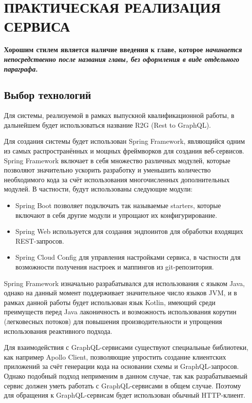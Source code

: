 \chapter{ПРАКТИЧЕСКАЯ РЕАЛИЗАЦИЯ СЕРВИСА}\label{ch:ch3}

\textbf{Хорошим стилем является наличие введения к главе, которое \textit{начинается непосредственно после названия главы, без оформления в виде отдельного параграфа}.}

\section{Выбор технологий}\label{sec:choose-technology}

Для системы, реализуемой в рамках выпускной квалификационной работы, в дальнейшем будет использоваться название R2G (Rest to GraphQL).

Для создания системы будет использован Spring Framework, являющийся одним из самых распространённых и мощных фреймворков для создания веб-сервисов.
Spring Framework включает в себя множество различных модулей, которые позволяют значительно ускорить разработку и уменьшить количество необходимого кода за счёт использования многочисленных дополнительных модулей.
В частности, будут использованы следующие модули:

\begin{itemize}
	\item Spring Boot позволяет подключать так называемые starters, которые включают в себя другие модули и упрощают их конфигурирование.
	\item Spring Web используется для создания эндпоинтов для обработки входящих REST-запросов.
	\item Spring Cloud Config для управления настройками сервиса, в частности для возможности получения настроек и маппингов из git-репозитория.
\end{itemize}

Spring Framework изначально разрабатывался для использования с языком Java, однако на данный момент поддерживает значительное число языков JVM, и в рамках данной работы будет использован язык Kotlin, имеющий среди преимуществ перед Java лаконичность и возможность использования корутин (легковесных потоков) для повышения производительности и упрощения использования реактивного подхода.

Для взаимодействия с GraphQL-сервисами существуют специальные библиотеки, как например Apollo Client, позволяющие упростить создание клиентских приложений за счёт генерации кода на основании схемы и GraphQL-запросов.
Однако подобный подход неприменим в данном случае, так как разрабатываемый сервис должен уметь работать с GraphQL-сервисами в общем случае.
Поэтому для обращения к GraphQL-сервисам будет использован обычный HTTP-клиент.

